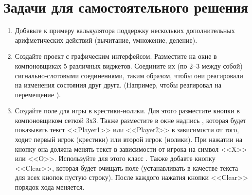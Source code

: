 \section[Задачи для самостоятельного решения]{Задачи для самостоятельного решения}
\begin{enumerate}
\item Добавьте к примеру калькулятора поддержку нескольких дополнительных арифметических действий (вычитание, умножение,
деление). 
\item Создайте проект с графическим интерфейсом. Разместите на окне в компоновщиках 5 различных виджетов. Соедините их
(по 2--3 между собой) сигнально-слотовыми соединениями, таким образом, чтобы они реагировали на изменения состояния друг
друга. (Например, чтобы  реагировал на перемещение ).
\item Создайте поле для игры в крестики-нолики.
Для этого разместите кнопки в компоновщиком  сеткой 3х3. Также разместите в окне
надпись , которая будет показывать текст <<Player1>> или <<Player2>> в зависимости от того, ходит первый игрок
(крестики) или второй игрок (нолики). При нажатии на кнопку она должна менять текст в зависимости от игрока на символ
<<X>> или <<O>>. Используйте для этого класс . Также добавте кнопку <<Clear>>, которая будет очищать поле
(устанавливать в качестве текста для всех кнопок пустую строку). После каждого нажатия кнопки <<Clear>> порядок хода
меняется.
\end{enumerate}

